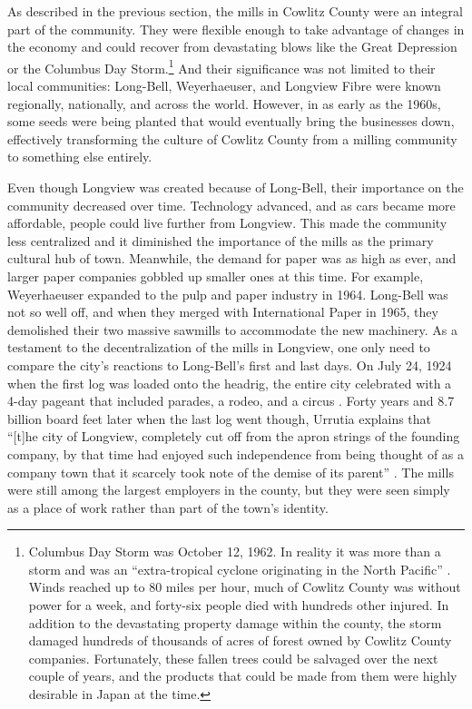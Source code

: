 As described in the previous section, the mills in Cowlitz County were an integral part of the community. They were flexible enough to take advantage of changes in the economy and could recover from devastating blows like the Great Depression or the Columbus Day Storm.\footnote{Columbus Day Storm was October 12, 1962. In reality it was more than a storm and was an ``extra-tropical cyclone originating in the North Pacific'' \citep[185]{wilma_2017}. Winds reached up to 80 miles per hour, much of Cowlitz County was without power for a week, and forty-six people died with hundreds other injured. In addition to the devastating property damage within the county, the storm damaged hundreds of thousands of acres of forest owned by Cowlitz County companies. Fortunately, these fallen trees could be salvaged over the next couple of years, and the products that could be made from them were highly desirable in Japan at the time.} And their significance was not limited to their local communities: Long-Bell, Weyerhaeuser, and Longview Fibre were known regionally, nationally, and across the world. However, in as early as the 1960s, some seeds were being planted that would eventually bring the businesses down, effectively transforming the culture of Cowlitz County from a milling community to something else entirely.

Even though Longview was created because of Long-Bell, their importance on the community decreased over time. Technology advanced, and as cars became more affordable, people could live further from Longview. This made the community less centralized and it diminished the importance of the mills as the primary cultural hub of town. Meanwhile, the demand for paper was as high as ever, and larger paper companies gobbled up smaller ones at this time. For example, Weyerhaeuser expanded to the pulp and paper industry in 1964. Long-Bell was not so well off, and when they merged with International Paper in 1965, they demolished their two massive sawmills to accommodate the new machinery. As a testament to the decentralization of the mills in Longview, one only need to compare the city's reactions to Long-Bell's first and last days. On July 24, 1924 when the first log was loaded onto the headrig, the entire city celebrated with a 4-day pageant that included parades, a rodeo, and a circus \citep[144]{urrutia_1998}. Forty years and 8.7 billion board feet later when the last log went though, Urrutia explains that ``[t]he city of Longview, completely cut off from the apron strings of the founding company, by that time had enjoyed such independence from being thought of as a company town that it scarcely took note of the demise of its parent'' \citeyear[188]{urrutia_1998}. The mills were still among the largest employers in the county, but they were seen simply as a place of work rather than part of the town's identity.

